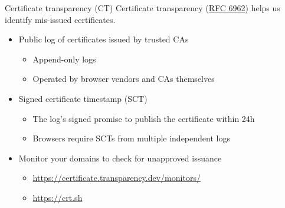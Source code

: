 \begin{frame}{Certificate transparency (CT)}
  Certificate transparency (\href{https://datatracker.ietf.org/doc/html/rfc6962}{RFC 6962}) helps us identify mis-issued certificates.
  \begin{itemize}[<+(1)->]
    \item Public log of certificates issued by trusted CAs
    \par
    \begin{itemize}
      \item Append-only logs
      \item Operated by browser vendors and CAs themselves
    \end{itemize}
    \item Signed certificate timestamp (SCT)
    \begin{itemize}
      \item The log's signed promise to publish the certificate within 24h
      \item Browsers require SCTs from multiple independent logs
    \end{itemize}
    \item Monitor your domains to check for unapproved issuance
    \begin{itemize}
      \item {\scriptsize{\url{https://certificate.transparency.dev/monitors/}}}
      \item {\scriptsize{\url{https://crt.sh}}}
    \end{itemize}
  \end{itemize}
\end{frame}

